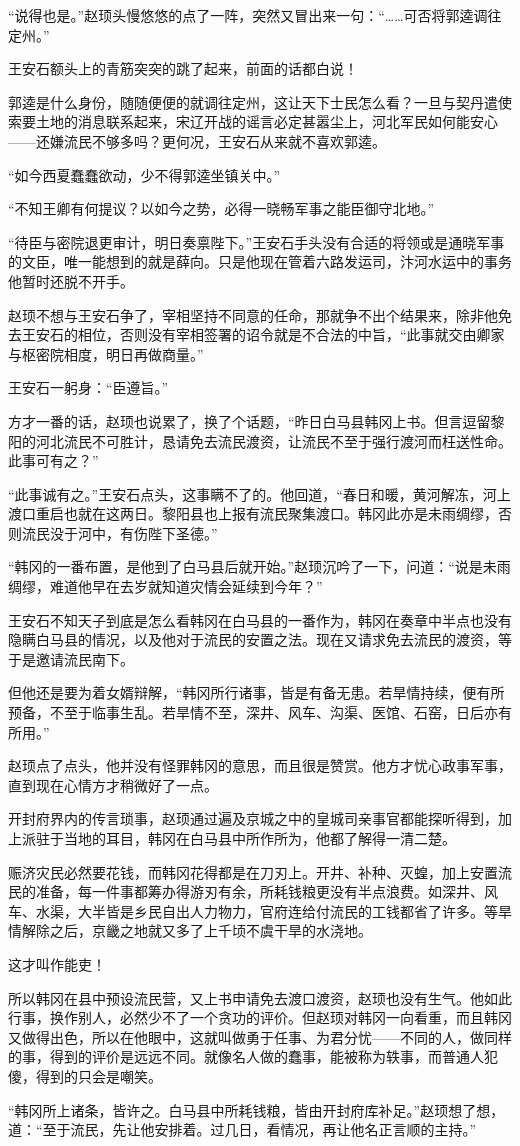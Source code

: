 “说得也是。”赵顼头慢悠悠的点了一阵，突然又冒出来一句：“……可否将郭逵调往定州。”

王安石额头上的青筋突突的跳了起来，前面的话都白说！

郭逵是什么身份，随随便便的就调往定州，这让天下士民怎么看？一旦与契丹遣使索要土地的消息联系起来，宋辽开战的谣言必定甚嚣尘上，河北军民如何能安心——还嫌流民不够多吗？更何况，王安石从来就不喜欢郭逵。

“如今西夏蠢蠢欲动，少不得郭逵坐镇关中。”

“不知王卿有何提议？以如今之势，必得一晓畅军事之能臣御守北地。”

“待臣与密院退更审计，明日奏禀陛下。”王安石手头没有合适的将领或是通晓军事的文臣，唯一能想到的就是薛向。只是他现在管着六路发运司，汴河水运中的事务他暂时还脱不开手。

赵顼不想与王安石争了，宰相坚持不同意的任命，那就争不出个结果来，除非他免去王安石的相位，否则没有宰相签署的诏令就是不合法的中旨，“此事就交由卿家与枢密院相度，明日再做商量。”

王安石一躬身：“臣遵旨。”

方才一番的话，赵顼也说累了，换了个话题，“昨日白马县韩冈上书。但言逗留黎阳的河北流民不可胜计，恳请免去流民渡资，让流民不至于强行渡河而枉送性命。此事可有之？”

“此事诚有之。”王安石点头，这事瞒不了的。他回道，“春日和暖，黄河解冻，河上渡口重启也就在这两日。黎阳县也上报有流民聚集渡口。韩冈此亦是未雨绸缪，否则流民没于河中，有伤陛下圣德。”

“韩冈的一番布置，是他到了白马县后就开始。”赵顼沉吟了一下，问道：“说是未雨绸缪，难道他早在去岁就知道灾情会延续到今年？”

王安石不知天子到底是怎么看韩冈在白马县的一番作为，韩冈在奏章中半点也没有隐瞒白马县的情况，以及他对于流民的安置之法。现在又请求免去流民的渡资，等于是邀请流民南下。

但他还是要为着女婿辩解，“韩冈所行诸事，皆是有备无患。若旱情持续，便有所预备，不至于临事生乱。若旱情不至，深井、风车、沟渠、医馆、石窑，日后亦有所用。”

赵顼点了点头，他并没有怪罪韩冈的意思，而且很是赞赏。他方才忧心政事军事，直到现在心情方才稍微好了一点。

开封府界内的传言琐事，赵顼通过遍及京城之中的皇城司亲事官都能探听得到，加上派驻于当地的耳目，韩冈在白马县中所作所为，他都了解得一清二楚。

赈济灾民必然要花钱，而韩冈花得都是在刀刃上。开井、补种、灭蝗，加上安置流民的准备，每一件事都筹办得游刃有余，所耗钱粮更没有半点浪费。如深井、风车、水渠，大半皆是乡民自出人力物力，官府连给付流民的工钱都省了许多。等旱情解除之后，京畿之地就又多了上千顷不虞干旱的水浇地。

这才叫作能吏！

所以韩冈在县中预设流民营，又上书申请免去渡口渡资，赵顼也没有生气。他如此行事，换作别人，必然少不了一个贪功的评价。但赵顼对韩冈一向看重，而且韩冈又做得出色，所以在他眼中，这就叫做勇于任事、为君分忧——不同的人，做同样的事，得到的评价是远远不同。就像名人做的蠢事，能被称为轶事，而普通人犯傻，得到的只会是嘲笑。

“韩冈所上诸条，皆许之。白马县中所耗钱粮，皆由开封府库补足。”赵顼想了想，道：“至于流民，先让他安排着。过几日，看情况，再让他名正言顺的主持。”

